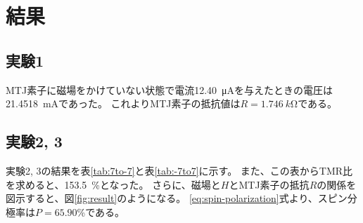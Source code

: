 \documentclass[../../../main]{subfiles}
\begin{document}
\section{結果}

\subsection{実験1}
MTJ素子に磁場をかけていない状態で電流\SI{12.40}{\micro A}を与えたときの電圧は\SI{21.4518}{mA}であった。
これよりMTJ素子の抵抗値は$R = \SI{1.746}{k\ohm}$である。

\subsection{実験2, 3}
実験2, 3の結果を表\ref{tab:7to-7}と表\ref{tab:-7to7}に示す。
また、この表からTMR比を求めると、\SI{153.5}{\%}となった。
さらに、磁場と$H$とMTJ素子の抵抗$R$の関係を図示すると、図\ref{fig:result}のようになる。
\ref{eq:spin-polarization}式より、スピン分極率は$P=65.90$\%である。




\end{document}
